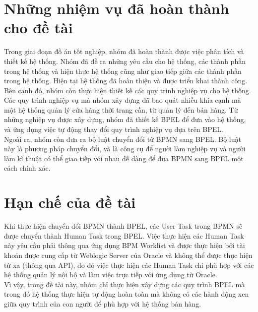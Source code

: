 \section{Những nhiệm vụ đã hoàn thành cho đề tài}
\hspace{0.5cm} Trong giai đoạn đồ án tốt nghiệp, nhóm đã hoàn thành được việc phân tích và thiết kế hệ thống. Nhóm đã đề ra những yêu cầu cho hệ thống, các thành phần trong hệ thống và hiện thực hệ thống cũng như giao tiếp giữa các thành phần trong hệ thống. Hiện tại hệ thống đã hoàn thiện và được triển khai thành công.\\

Bên cạnh đó, nhóm còn thực hiện thiết kế các quy trình nghiệp vụ cho hệ thống. Các quy trình nghiệp vụ mà nhóm xây dựng đã bao quát nhiều khía cạnh mà một hệ thống quản lý cửa hàng thời trang cần, từ quản lý đến bán hàng. Từ những nghiệp vụ được xây dựng, nhóm đã thiết kế BPEL để đưa vào hệ thống, và ứng dụng việc tự động thay đổi quy trình nghiệp vụ dựa trên BPEL.\\

Ngoài ra, nhóm còn đưa ra bộ luật chuyển đổi từ BPMN sang BPEL. Bộ luật này là phương pháp chuyển đổi, và là công cụ để người làm nghiệp vụ và người làm kĩ thuật có thể giao tiếp với nhau dễ dàng để đưa BPMN sang BPEL một cách chính xác.

\section{Hạn chế của đề tài}
\hspace{0.5cm} Khi thực hiện chuyển đổi BPMN thành BPEL, các User Task trong BPMN sẽ được chuyển thành Human Task trong BPEL. Việc thực hiện các Human Task này yêu cầu phải thông qua ứng dụng BPM Worklist và được thực hiện bởi tài khoản được cung cấp từ Weblogic Server của Oracle và không thể được thực hiện từ xa (thông qua API), do đó việc thực hiện các Human Task chỉ phù hợp với các hệ thống quản lý nội bộ và làm việc trực tiếp với ứng dụng từ Oracle.\\

Vì vậy, trong đề tài này, nhóm chỉ thực hiện xây dựng các quy trình BPEL mà trong đó hệ thống thực hiện tự động hoàn toàn mà không có các hành động xen giữa quy trình của con người để phù hợp với hệ thống bán hàng.

